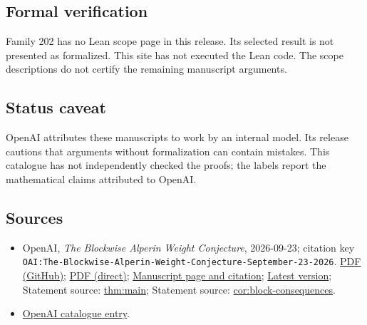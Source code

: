 \documentclass[11pt]{article}
\begin{document}
\subsection{Formal verification}
Family 202 has no Lean scope page in this release. Its selected result is not presented as formalized. This site has not executed the Lean code. The scope descriptions do not certify the remaining manuscript arguments.

\subsection{Status caveat}
OpenAI attributes these manuscripts to work by an internal model. Its release cautions that arguments without formalization can contain mistakes. This catalogue has not independently checked the proofs; the labels report the mathematical claims attributed to OpenAI.

\subsection{Sources}
\begin{itemize}
\item OpenAI, \emph{The Blockwise Alperin Weight Conjecture}, 2026-09-23; citation key \texttt{OAI:The-Blockwise-Alperin-Weight-Conjecture-September-23-2026}. \href{https://github.com/openai/math/blob/adc7f1241b42e322a6451854ab7e4b4c146bf78a/preprints/The-Blockwise-Alperin-Weight-Conjecture-September-23-2026/paper.pdf}{PDF (GitHub)}; \href{https://github.com/openai/math/raw/adc7f1241b42e322a6451854ab7e4b4c146bf78a/preprints/The-Blockwise-Alperin-Weight-Conjecture-September-23-2026/paper.pdf}{PDF (direct)}; \href{https://github.com/openai/math/blob/adc7f1241b42e322a6451854ab7e4b4c146bf78a/preprints/The-Blockwise-Alperin-Weight-Conjecture-September-23-2026/README.md}{Manuscript page and citation}; \href{https://github.com/openai/math/blob/main/preprints/The-Blockwise-Alperin-Weight-Conjecture-September-23-2026/paper.pdf}{Latest version}; Statement source: \href{https://github.com/openai/math/blob/adc7f1241b42e322a6451854ab7e4b4c146bf78a/preprints/The-Blockwise-Alperin-Weight-Conjecture-September-23-2026/build/sections/intro.tex\#L42}{thm:main}; Statement source: \href{https://github.com/openai/math/blob/adc7f1241b42e322a6451854ab7e4b4c146bf78a/preprints/The-Blockwise-Alperin-Weight-Conjecture-September-23-2026/build/sections/intro.tex\#L61}{cor:block-consequences}.
\item \href{https://github.com/openai/math/blob/adc7f1241b42e322a6451854ab7e4b4c146bf78a/CONTENTS.md}{OpenAI catalogue entry}.
\end{itemize}
\end{document}
